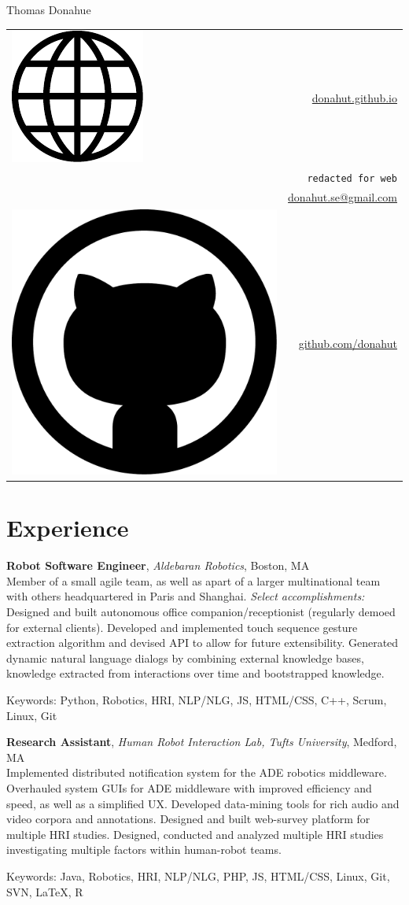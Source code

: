 \documentclass[10pt, letter]{article}
\newcommand*\globe{\includegraphics[height=1.6ex]{globe.pdf}}
\newcommand*\github{\includegraphics[height=2ex]{github.pdf}}
\newcommand{\years}[1]{\marginnote{\footnotesize #1}}
\newenvironment{desc*}{
  \begin{description}
    \setlength{\itemsep}{0.2pt}
    \setlength{\parskip}{-1pt}
    \setlength{\parsep}{0pt}
  }{
  \end{description}
}
\begin{document}
\begin{minipage}[t]{0.55\textwidth}
  {\Huge Thomas Donahue}
\end{minipage}
\begin{minipage}[t]{0.45\textwidth}
  \flushright 
  \begin{tabular}[h]{lr}
    \globe{}    & \href{http://donahut.github.io}{donahut.github.io}\\    
    \Phone{}    & \texttt{redacted for web}\\
    \Envelope{} & \href{mailto:donahut.se@gmail.com}{donahut.se@gmail.com}\\    
    \github{}   & \href{http://www.github.com/donahut}{github.com/donahut}
  \end{tabular}
\end{minipage}

\section*{Experience}
\years{Mar 2014 --} 
\textbf{Robot Software Engineer}, 
\textsl{Aldebaran  Robotics}, Boston, MA\\ 
Member of a small agile team, as well as apart of a larger
multinational team with others headquartered in Paris and Shanghai.
\textsl{Select accomplishments:} Designed and built autonomous office
companion/receptionist (regularly demoed for external clients).
Developed and implemented touch sequence gesture extraction algorithm
and devised API to allow for future extensibility. Generated dynamic
natural language dialogs by combining external knowledge bases,
knowledge extracted from interactions over time and bootstrapped
knowledge.

\begin{desc*}
\item[Keywords:] Python, Robotics, HRI, NLP/NLG, JS, HTML/CSS, C++, Scrum,
  Linux, Git
\end{desc*}

\years{2012 - 2014} 
\textbf{Research Assistant}, 
\textsl{Human Robot Interaction Lab, Tufts University}, Medford, MA\\ 
Implemented distributed notification system for the ADE robotics
middleware. Overhauled system GUIs for ADE middleware with improved
efficiency and speed, as well as a simplified UX. Developed
data-mining tools for rich audio and video corpora and annotations.
Designed and built web-survey platform for multiple HRI studies.
Designed, conducted and analyzed multiple HRI studies investigating
multiple factors within human-robot teams.
\begin{desc*}
\item[Keywords:] Java, Robotics, HRI, NLP/NLG, PHP, JS, HTML/CSS, Linux, Git,
  SVN, \LaTeX, R
\end{desc*}
\end{document}
